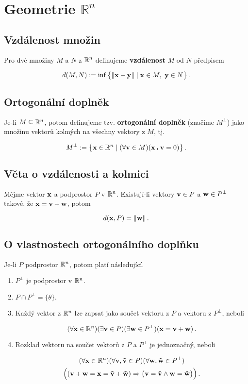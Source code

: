 \section{Geometrie $\mathbb{R}^n$}

\subsection*{Vzdálenost množin}

Pro dvě množiny $M$ a $N$ z $\mathbb{R}^n$ definujeme \textbf{vzdálenost} $M$ od $N$
předpisem

\[ d(M,N):=\inf \big\{\|\mathbf{x}-\mathbf{y}\|\mid \mathbf{x}\in M,\ \mathbf{y}\in N\big\}\,. \]

\subsection*{Ortogonální doplněk}

Je-li $M\subseteq \mathbb{R}^n$, potom definujeme tzv. \textbf{ortogonální doplněk}
(značíme $M^\perp$) jako množinu vektorů kolmých na všechny vektory z $M$, tj.

\[ M^{\perp}:=\big\{\mathbf{x}\in \mathbb{R}^n\mid (\forall \mathbf{v}\in M)(\mathbf{x}\centerdot \mathbf{v}=0)\big\}\,. \]

\subsection*{Věta o vzdálenosti a kolmici}

Mějme vektor $\mathbf{x}$ a podprostor $P$ v $\mathbb{R}^n$. Existují-li vektory $\mathbf{v}\in P$ a
$\mathbf{w}\in P^\perp$ takové, že $\mathbf{x}=\mathbf{v}+\mathbf{w}$, potom

\[ d(\mathbf{x},P)=\|\mathbf{w}\|\,. \]

\subsection*{O vlastnostech ortogonálního doplňku}

Je-li $P$ podprostor $\mathbb{R}^n$, potom platí následující.

\begin{enumerate}
	\item  $P^\perp$ je podprostor v $\mathbb{R}^n$.
	\item $P\cap P^\perp=\{\theta\}$.
	\item Každý vektor z $\mathbb{R}^n$ lze zapsat jako součet vektoru z $P$ a vektoru z
	      $P^\perp$, neboli

	      \[ (\forall \mathbf{x}\in \mathbb{R}^n)(\exists \mathbf{v}\in P)(\exists \mathbf{w}\in P^\perp)(\mathbf{x}=\mathbf{v}+\mathbf{w})\,. \]
	\item Rozklad vektoru na součet vektorů z $P$ a $P^\perp$ je jednoznačný, neboli

	      \begin{gather*}
		      (\forall \mathbf{x}\in \mathbb{R}^n)(\forall \mathbf{v},\tilde {\mathbf{v}} \in P)(\forall \mathbf{w}, \tilde {\mathbf{w}} \in P^\perp)\\
		      \Big((\mathbf{v}+\mathbf{w}=\mathbf{x}=\tilde {\mathbf{v}}+\tilde {\mathbf{w}})\Rightarrow \big(\mathbf{v}=\tilde {\mathbf{v}} \wedge \mathbf{w}=\tilde {\mathbf{w}}\big)\Big)\,.
	      \end{gather*}

\end{enumerate}

